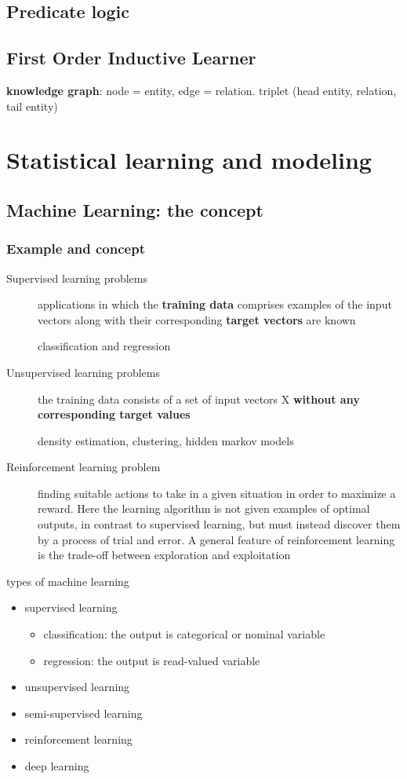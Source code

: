 \documentclass[11pt]{article}
\begin{document}
\subsection{Predicate logic}
\label{sec:org6a05c69}
\subsection{First Order Inductive Learner}
\label{sec:orgf878f78}
\textbf{knowledge graph}: node = entity, edge = relation.
triplet (head entity, relation, tail entity)
\section{Statistical learning and modeling}
\label{sec:org3b29851}
\subsection{Machine Learning: the concept}
\label{sec:orgb1ad905}
\subsubsection{Example and concept}
\label{sec:orgb08d8a3}
\begin{description}
\item[{Supervised learning problems}] applications in which the \textbf{training data} comprises examples of the input
vectors along with their corresponding \textbf{target vectors} are known

classification and regression
\item[{Unsupervised learning problems}] the training data consists of a set of input vectors X \textbf{without any
corresponding target values}

density estimation, clustering, hidden markov models
\item[{Reinforcement learning problem}] finding suitable actions to take in a given situation in order to
maximize a reward. Here the learning algorithm is not given examples of
optimal outputs, in contrast to supervised learning, but must instead
discover them by a process of trial and error. A general feature of
reinforcement learning is the trade-off between exploration and exploitation
\end{description}

types of machine learning
\begin{itemize}
\item supervised learning
\begin{itemize}
\item classification: the output is categorical or nominal variable
\item regression: the output is read-valued variable
\end{itemize}
\item unsupervised learning
\item semi-supervised learning
\item reinforcement learning
\item deep learning
\end{itemize}
\end{document}
